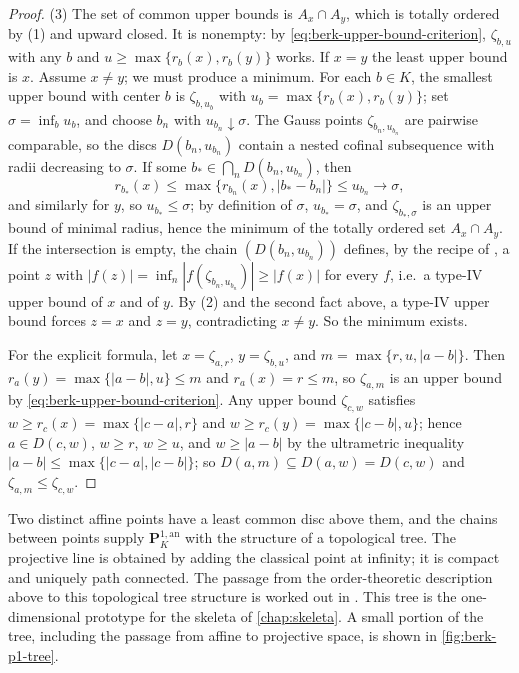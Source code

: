 \begin{proof}
(3) The set of common upper bounds is
$A_x\cap A_y$, which is totally ordered by (1) and upward closed.
It is nonempty: by
\eqref{eq:berk-upper-bound-criterion}, $\zeta_{b,u}$ with any
$b$ and $u\geq\max\{r_b(x),r_b(y)\}$ works.  If $x=y$ the least
upper bound is $x$.  Assume $x\neq y$; we must produce a minimum.
For each $b\in K$, the smallest upper bound with center $b$ is
$\zeta_{b,u_b}$ with $u_b=\max\{r_b(x),r_b(y)\}$; set
$\sigma=\inf_bu_b$, and choose $b_n$ with
$u_{b_n}\downarrow\sigma$.  The Gauss points
$\zeta_{b_n,u_{b_n}}$ are pairwise comparable, so the discs
$D(b_n,u_{b_n})$ contain a nested cofinal subsequence with radii
decreasing to $\sigma$.  If some $b_*\in\bigcap_nD(b_n,u_{b_n})$,
then
\[
 r_{b_*}(x)\leq\max\{r_{b_n}(x),|b_*-b_n|\}\leq u_{b_n}
 \longrightarrow\sigma,
\]
and similarly for $y$, so $u_{b_*}\leq\sigma$; by definition of
$\sigma$, $u_{b_*}=\sigma$, and
$\zeta_{b_*,\sigma}$ is an upper bound of minimal radius, hence the
minimum of the totally ordered set $A_x\cap A_y$.  If the
intersection is empty, the chain $(D(b_n,u_{b_n}))$ defines, by the
recipe of , a point $z$ with
$|f(z)|=\inf_n|f(\zeta_{b_n,u_{b_n}})|\geq|f(x)|$ for every $f$,
i.e.\ a type-IV upper bound of $x$ and of $y$.  By (2) and the
second fact above, a type-IV upper bound forces $z=x$ and $z=y$,
contradicting $x\neq y$.  So the minimum exists.

For the explicit formula, let $x=\zeta_{a,r}$, $y=\zeta_{b,u}$, and
$m=\max\{r,u,|a-b|\}$.  Then
$r_a(y)=\max\{|a-b|,u\}\le m$ and $r_a(x)=r\leq m$, so
$\zeta_{a,m}$ is an upper bound by
\eqref{eq:berk-upper-bound-criterion}.  Any upper bound
$\zeta_{c,w}$ satisfies $w\geq r_c(x)=\max\{|c-a|,r\}$ and
$w\geq r_c(y)=\max\{|c-b|,u\}$; hence $a\in D(c,w)$, $w\geq r$,
$w\geq u$, and $w\geq|a-b|$ by the ultrametric inequality
$|a-b|\le\max\{|c-a|,|c-b|\}$; so
$D(a,m)\subseteq D(a,w)=D(c,w)$ and
$\zeta_{a,m}\leq\zeta_{c,w}$.
\end{proof}

Two distinct affine points have a least common
disc above them, and the chains between points supply
$\mathbf P^{1,\mathrm{an}}_K$ with the structure of a topological tree.
The projective line is obtained by adding the classical point at infinity;
it is compact and uniquely path connected.  The passage from the
order-theoretic description above to this topological tree structure is
worked out in \cite[Chapter~2]{BakerRumely2010}. This tree is the
one-dimensional prototype for the skeleta of \cref{chap:skeleta}.  A small
portion of the tree, including the passage from affine to projective space,
is shown in \cref{fig:berk-p1-tree}.

